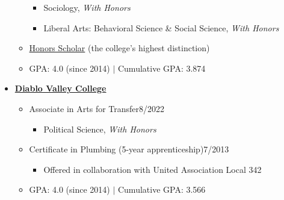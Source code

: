 \begin{itemize}[leftmargin=0em, itemsep=0pt]
\begin{itemize}[leftmargin=2em, itemsep=0pt]
\begin{itemize}[leftmargin=2em, itemsep=0pt]
        \item[] Sociology, \textit{With Honors}
        \item[] Liberal Arts: Behavioral Science \& Social Science, \textit{With Honors}
    \end{itemize}
    \item[] \href{https://www.losmedanos.edu/honors/prog.aspx}{Honors Scholar} (the college’s highest distinction)
    \item[] GPA: 4.0 (since 2014) $|$ Cumulative GPA: 3.874
\end{itemize}
\vspace{12pt}
\item[] \textbf{\href{https://www.dvc.edu/}{Diablo Valley College}}
\begin{itemize}[leftmargin=2em, itemsep=0pt]
    \item[] Associate in Arts for Transfer\hfill{}8/2022
    \begin{itemize}[leftmargin=2em, itemsep=0pt]
        \item[] Political Science, \textit{With Honors}
    \end{itemize}
    \item[] Certificate in Plumbing (5-year apprenticeship)\hfill{}7/2013
    \begin{itemize}[leftmargin=2em, itemsep=0pt]
        \item[] Offered in collaboration with United Association Local 342
    \end{itemize}
    \item[] GPA: 4.0 (since 2014) $|$ Cumulative GPA: 3.566
\end{itemize}
\end{itemize}

